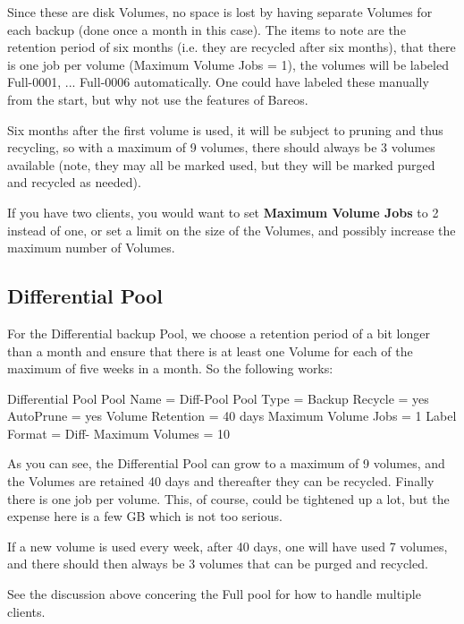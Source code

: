 Since these are disk Volumes, no space is lost by having separate Volumes for
each backup (done once a month in this case). The items to note are the
retention period of six months (i.e. they are recycled after six months), that
there is one job per volume (Maximum Volume Jobs = 1), the volumes will be
labeled Full-0001, ... Full-0006 automatically. One could have labeled these
manually from the start, but why not use the features of Bareos.

Six months after the first volume is used, it will be subject to pruning
and thus recycling, so with a maximum of 9 volumes, there should always be
3 volumes available (note, they may all be marked used, but they will be
marked purged and recycled as needed).

If you have two clients, you would want to set {\bf Maximum Volume Jobs} to
2 instead of one, or set a limit on the size of the Volumes, and possibly
increase the maximum number of Volumes.


\label{DiffPool}
\subsection{Differential Pool}

For the Differential backup Pool, we choose a retention period of a bit longer
than a month and ensure that there is at least one Volume for each of the
maximum of five weeks in a month. So the following works:

\begin{bconfig}{Differential Pool}
Pool {
  Name = Diff-Pool
  Pool Type = Backup
  Recycle = yes
  AutoPrune = yes
  Volume Retention = 40 days
  Maximum Volume Jobs = 1
  Label Format = Diff-
  Maximum Volumes = 10
}
\end{bconfig}

As you can see, the Differential Pool can grow to a maximum of 9 volumes,
and the Volumes are retained 40 days and thereafter they can be recycled. Finally
there is one job per volume. This, of course, could be tightened up a lot, but
the expense here is a few GB which is not too serious.

If a new volume is used every week, after 40 days, one will have used 7
volumes, and there should then always be 3 volumes that can be purged and
recycled.

See the discussion above concering the Full pool for how to handle multiple
clients.

\label{IncPool}
